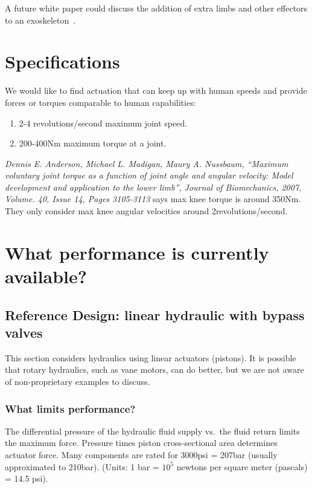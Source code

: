 \documentclass[letterpaper,12pt,fullpage]{article}
\begin{document}
A future white paper could discuss the addition of extra limbs and
other effectors to an exoskeleton~\cite{IEEE07139896}.


%


\section{Specifications}

We would like to find actuation that can keep up with human
speeds and provide forces or torques comparable to human capabilities:
\begin{enumerate}
\item
2-4 revolutions/second maximum joint speed.
\item
200-400Nm maximum torque at a joint.
\end{enumerate}

{\it Dennis E. Anderson, Michael L. Madigan, Maury A. Nussbaum,
“Maximum voluntary joint torque as a function of joint angle and
angular velocity: Model development and application to the lower
limb”, Journal of Biomechanics, 2007, Volume. 40, Issue 14, Pages
3105-3113} says max knee torque is around 350Nm. They only consider
max knee angular velocities around 2revolutions/second.

\section{What performance is currently available?}

\subsection{Reference Design: linear hydraulic with bypass valves}

This section considers hydraulics using linear actuators (pistons).
It is possible that rotary hydraulics, such as vane motors,
can do better, but we are not aware of non-proprietary examples
to discuss.

\subsubsection{What limits performance?}

The differential pressure of the hydraulic fluid supply vs.\ the fluid
return limits the maximum force. Pressure times piston cross-sectional area
determines actuator force.
Many components are rated for 3000psi = 207bar (usually approximated to
210bar).
(Units: 1 bar = $10^5$ newtons per square meter (pascals) = 14.5 psi).
\end{document}
